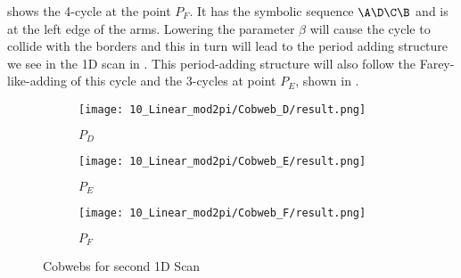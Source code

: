  shows the 4-cycle at the point $P_F$.
It has the symbolic sequence $\A\D\C\B$ and is at the left edge of the arms.
Lowering the parameter $\beta$ will cause the cycle to collide with the borders and this in turn will lead to the period adding structure we see in the 1D scan in .
This period-adding structure will also follow the Farey-like-adding of this cycle and the 3-cycles at point $P_E$, shown in .

\begin{figure}
	\centering
	\begin{subfigure}{0.3\textwidth}
		\centering
		\texttt{[image: 10\_Linear\_mod2pi/Cobweb\_D/result.png]}
		\caption{$P_D$}
		\label{fig:pcw.lin.CobwebD}
	\end{subfigure}
	\begin{subfigure}{0.3\textwidth}
		\centering
		\texttt{[image: 10\_Linear\_mod2pi/Cobweb\_E/result.png]}
		\caption{$P_E$}
		\label{fig:pcw.lin.CobwebE}
	\end{subfigure}
	\begin{subfigure}{0.3\textwidth}
		\centering
		\texttt{[image: 10\_Linear\_mod2pi/Cobweb\_F/result.png]}
		\caption{$P_F$}
		\label{fig:pcw.lin.CobwebF}
	\end{subfigure}
	\caption{Cobwebs for second 1D Scan}
	\label{fig:pcw.lin.CobwebD-F}
\end{figure}
